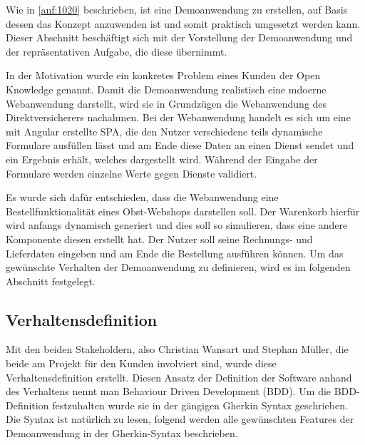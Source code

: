
Wie in \autoref{anf:1020} beschrieben, ist eine Demoanwendung zu erstellen, auf Basis dessen das Konzept anzuwenden ist und somit praktisch umgesetzt werden kann. Dieser Abschnitt beschäftigt sich mit der Vorstellung der Demoanwendung und der repräsentativen Aufgabe, die diese übernimmt.

In der Motivation wurde ein konkretes Problem eines Kunden der Open Knowledge genannt. Damit die Demoanwendung realistisch eine mdoerne Webanwendung darstellt, wird sie in Grundzügen die Webanwendung des Direktversicherers nachahmen. Bei der Webanwendung handelt es sich um eine mit Angular erstellte SPA, die den Nutzer verschiedene teils dynamische Formulare ausfüllen lässt und am Ende diese Daten an einen Dienst sendet und ein Ergebnis erhält, welches dargestellt wird. Während der Eingabe der Formulare werden einzelne Werte gegen Dienste validiert.

Es wurde sich dafür entschieden, dass die Webanwendung eine Bestellfunktionalität eines Obst-Webshops darstellen soll. Der Warenkorb hierfür wird anfangs dynamisch generiert und dies soll so simulieren, dass eine andere Komponente diesen erstellt hat. Der Nutzer soll seine Rechnungs- und Lieferdaten eingeben und am Ende die Bestellung ausführen können. Um das gewünschte Verhalten der Demoanwendung zu definieren, wird es im folgenden Abschnitt festgelegt.

\subsection{Verhaltensdefinition}

Mit den beiden Stakeholdern, also Christian Wansart und Stephan Müller, die beide am Projekt für den Kunden involviert sind, wurde diese Verhaltensdefinition erstellt. Diesen Ansatz der Definition der Software anhand des Verhaltens nennt man Behaviour Driven Development (BDD). Um die BDD-Definition festzuhalten wurde sie in der gängigen Gherkin \cite{Gherkin} Syntax geschrieben. Die Syntax ist natürlich zu lesen, folgend werden alle gewünschten Features der Demoanwendung in der Gherkin-Syntax beschrieben.

